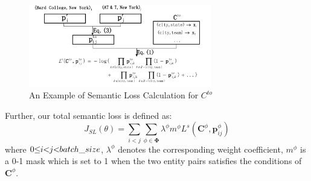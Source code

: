 

\begin{figure}
	\centering
	\includegraphics[width=8cm]{./result-figure/example.pdf}
	\vspace{-2em}
	\caption{{\small An Example of Semantic Loss Calculation for $C^{to}$}}
	\label{fig:example}
	\vspace{-1.5em}
\end{figure}


Further, our total semantic loss is defined as:
\begin{equation}
	J_{SL}(\theta) = \sum\limits_{i < j}{\sum_{\phi \in \bm{\Phi}}{\lambda ^{\phi}m^{\phi}L^{s}(\bm{C}^{\phi}, \bm{p}_{ij}^{\phi})}}
\end{equation}
where $0\hspace{-0.3em}\leq\hspace{-0.3em}i\hspace{-0.3em}<\hspace{-0.3em}j\hspace{-0.3em}<\hspace{-0.3em}batch\_size$,
$\lambda^{\phi}$ denotes the corresponding weight coefficient, 
$m^{\phi}$ is a 0-1 mask which is set to 1 when the two entity pairs satisfies the conditions of $\bm{C}^{\phi}$.

